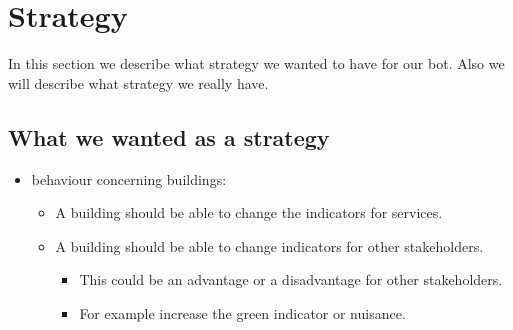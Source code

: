 \section{Strategy}
\label{sec:appendixa}
In this section we describe what strategy we wanted to have for our bot. Also we will describe what strategy we really have.
\subsection{What we wanted as a strategy}
\begin{itemize}
	\item behaviour concerning buildings:
	\begin{itemize}
		\item  A building should be able to change the indicators for services.
		\item A building should be able to change indicators for other stakeholders.
		\begin{itemize}
			\item This could be an advantage or a disadvantage for other stakeholders.
			\item For example increase the green indicator or nuisance.
		\end{itemize}
	

\end{itemize}
\end{itemize}
